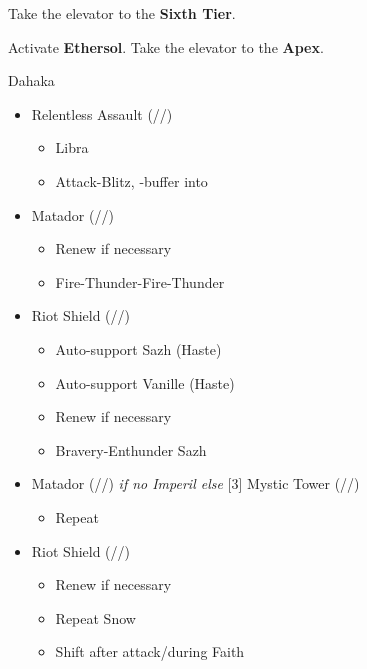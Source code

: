 \begin{multicols}{2}
  \renewcommand{\first}{[1] Riot Shield (\syn/\sen/\rav)}
  \renewcommand{\second}{[2] Relentless Assault (\com/\rav/\rav)}
  \renewcommand{\third}{[3] Mystic Tower (\rav/\sen/\rav)}
  \renewcommand{\fourth}{[4] Aggression (\com/\com/\rav)}
  \renewcommand{\fifth}{[5] Matador (\rav/\sen/\sab)}
  \renewcommand{\sixth}{[6] Aggression (\com/\com/\rav)}

  Take the elevator to the \textbf{Sixth Tier}.

  Activate \textbf{Ethersol}.
  Take the elevator to the \textbf{Apex}.

  \begin{battle}[1:30]{Dahaka}
    \begin{itemize}
      \item \second
            \begin{itemize}
              \item Libra
              \item Attack-Blitz, \rav-buffer into
            \end{itemize}
      \item \fifth
            \begin{itemize}
              \item Renew if necessary
              \item Fire-Thunder-Fire-Thunder
            \end{itemize}
      \item \first
            \begin{itemize}
              \item Auto-support Sazh (Haste)
              \item Auto-support Vanille (Haste)
              \item Renew if necessary
              \item Bravery-Enthunder Sazh
            \end{itemize}
      \item \fifth \textit{ if no Imperil else } \third
            \begin{itemize}
              \item Repeat
            \end{itemize}
      \item \first
            \begin{itemize}
              \item Renew if necessary
              \item Repeat Snow
              \item Shift after attack/during Faith

\end{itemize}
\end{itemize}
\end{battle}
\end{multicols}
